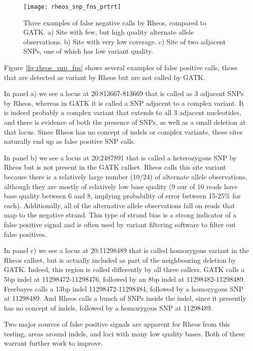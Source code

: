 \begin{figure}[h!]
    \texttt{[image: rheos\_snp\_fns\_prtrt]}
    \centering
    \caption {Three examples of false negative calls by Rheos, compared to GATK. a) Site with few, but high quality alternate allele observations. b) Site with very low coverage. c) Site of two adjacent SNPs, one of which has low variant quality.}
    \label{fig:rheos_snp_fns}
\end{figure}

Figure \ref{fig:rheos_snp_fps} shows several examples of false positive calls, those that are detected as variant by Rheos but are not called by GATK. 

In panel a) we see a locus at 20:813667-813669 that is called as 3 adjacent SNPs by Rheos, whereas in GATK it is called a SNP adjacent to a complex variant. It is indeed probably a complex variant that extends to all 3 adjacent nucleotides, and there is evidence of both the presence of SNPs, as well as a small deletion at that locus. Since Rheos has no concept of indels or complex variants, these sites naturally end up as false positive SNP calls. 

In panel b) we see a locus at 20:2487891 that is called a heterozygous SNP by Rheos but is not present in the GATK callset. Rheos calls this site variant because there is a relatively large number (10/24) of alternate allele observations, although they are mostly of relatively low base quality (9 our of 10 reads have base quality between 6 and 8, implying probability of error between 15-25\% for each). Additionally, all of the alternative allele observations fall on reads that map to the negative strand. This type of strand bias is a strong indicator of a false positive signal and is often used by variant filtering software to filter out false positives.

In panel c) we see a locus at 20:11298489 that is called homozygous variant in the Rheos callset, but is actually included as part of the neighbouring deletion by GATK. Indeed, this region is called differently by all three callers. GATK calls a 5bp indel at 11298472-11298476, followed by an 8bp indel at 11298482-11298489. Freebayes calls a 13bp indel 11298472-11298484, followed by a homozygous SNP at 11298489. And Rheos calls a bunch of SNPs inside the indel, since it presently has no concept of indels, followed by a homozygous SNP at 11298489. 

Two major sources of false positive signals are apparent for Rheos from this testing, areas around indels, and loci with many low quality bases. Both of these warrant further work to improve. 

